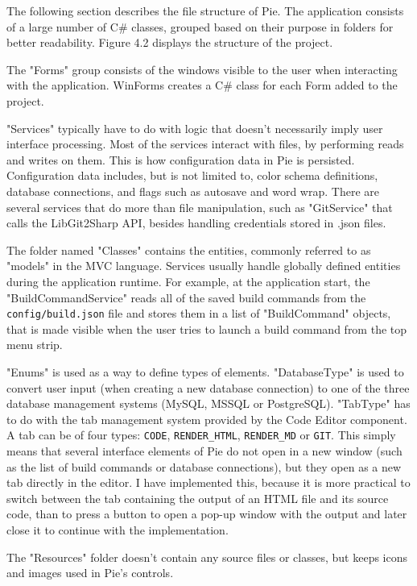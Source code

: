 The following section describes the file structure of Pie. The application consists of a large number of C\# classes, grouped based on their purpose in folders for better readability. Figure 4.2 displays the structure of the project.

The "Forms" group consists of the windows visible to the user when interacting with the application. WinForms creates a C\# class for each Form added to the project.

"Services" typically have to do with logic that doesn't necessarily imply user interface processing. Most of the services interact with files, by performing reads and writes on them. This is how configuration data in Pie is persisted. Configuration data includes, but is not limited to, color schema definitions, database connections, and flags such as autosave and word wrap. There are several services that do more than file manipulation, such as "GitService" that calls the LibGit2Sharp API, besides handling credentials stored in .json files.

The folder named "Classes" contains the entities, commonly referred to as "models" in the MVC language. Services usually handle globally defined entities during the application runtime. For example, at the application start, the "BuildCommandService" reads all of the saved build commands from the \texttt{config/build.json} file and stores them in a list of "BuildCommand" objects, that is made visible when the user tries to launch a build command from the top menu strip.

"Enums" is used as a way to define types of elements. "DatabaseType" is used to convert user input (when creating a new database connection) to one of the three database management systems (MySQL, MSSQL or PostgreSQL). "TabType" has to do with the tab management system provided by the Code Editor component. A tab can be of four types: \texttt{CODE}, \texttt{RENDER\_HTML}, \texttt{RENDER\_MD} or \texttt{GIT}. This simply means that several interface elements of Pie do not open in a new window (such as the list of build commands or database connections), but they open as a new tab directly in the editor. I have implemented this, because it is more practical to switch between the tab containing the output of an HTML file and its source code, than to press a button to open a pop-up window with the output and later close it to continue with the implementation.

The "Resources" folder doesn't contain any source files or classes, but keeps icons and images used in Pie's controls. 

